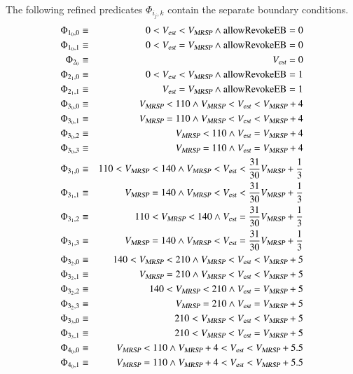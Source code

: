  
The following refined predicates $\Phi_{i_j,k}$ contain the separate boundary conditions. 
\begin{eqnarray*}
\Phi_{1_0,0} & \equiv &  0 < \vest < \vmax \wedge \areb = 0
\\
\Phi_{1_0,1} & \equiv & 
 0 < \vest = \vmax \wedge \areb = 0
\\
\Phi_{2_0} & \equiv & \vest = 0 %
\\
\Phi_{2_1,0} & \equiv &  0 < \vest < \vmax \wedge \areb = 1
\\
\Phi_{2_1,1} & \equiv &  \vest = \vmax \wedge \areb = 1
\\
\Phi_{3_0,0} & \equiv &  \vmax < 110 \wedge   \vmax <  \vest < \vmax +4  
\\
\Phi_{3_0,1} & \equiv &  \vmax = 110 \wedge   \vmax <  \vest < \vmax +4  
\\
\Phi_{3_0,2} & \equiv &  \vmax < 110 \wedge     \vest = \vmax +4  
\\
\Phi_{3_0,3} & \equiv &  \vmax = 110 \wedge    \vest = \vmax +4  
\\
\Phi_{3_1,0} & \equiv &   110<\vmax < 140  \wedge \vmax < \vest < \frac{31}{30}\vmax +\frac{1}{3}
\\
\Phi_{3_1,1} & \equiv &   \vmax = 140  \wedge \vmax < \vest < \frac{31}{30}\vmax +\frac{1}{3}
\\
\Phi_{3_1,2} & \equiv &   110<\vmax < 140  \wedge  \vest = \frac{31}{30}\vmax +\frac{1}{3}
\\
\Phi_{3_1,3} & \equiv &   \vmax = 140  \wedge \vmax < \vest = \frac{31}{30}\vmax +\frac{1}{3}
\\
\Phi_{3_2,0} & \equiv &   140 < \vmax < 210 \wedge \vmax <  \vest <\vmax + 5
\\
\Phi_{3_2,1} & \equiv &    \vmax = 210 \wedge \vmax <  \vest <\vmax + 5
\\
\Phi_{3_2,2} & \equiv &   140 < \vmax < 210 \wedge   \vest =\vmax + 5
\\
\Phi_{3_2,3} & \equiv &    \vmax = 210 \wedge   \vest =\vmax + 5 
\\
\Phi_{3_3,0} & \equiv &   210 < \vmax <  \vest <\vmax + 5 
\\
\Phi_{3_3,1} & \equiv &   210 < \vmax <  \vest =\vmax + 5 
\\
\Phi_{4_0,0} & \equiv &   \vmax < 110 \wedge \vmax +4 < \vest < \vmax + 5.5 
\\
\Phi_{4_0,1} & \equiv &   \vmax = 110 \wedge \vmax +4 < \vest < \vmax + 5.5 
\\

\end{eqnarray*}

